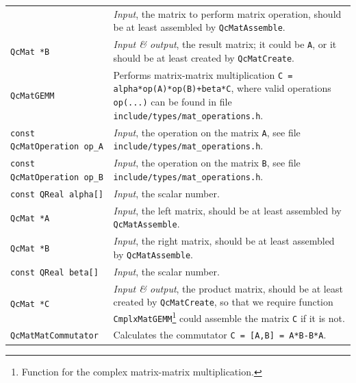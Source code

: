 \documentclass[a4paper,11pt,twoside,openright]{book}
\begin{document}
\begin{center}
\begin{longtable}{l|p{}}
      & \textsl{Input}, the matrix to perform matrix operation, should be
        at least assembled by \verb|QcMatAssemble|.\\
    \hspace*{2ex}\verb|QcMat *B| %
      & \textsl{Input \& output}, the result matrix; it could be \verb|A|, or it should
        be at least created by \verb|QcMatCreate|.\\
    \hline
%
    \verb|QcMatGEMM|\index{\texttt{QcMatGEMM}} %
      & Performs matrix-matrix multiplication \verb|C = alpha*op(A)*op(B)+beta*C|,
        where valid operations \verb|op(...)| can be found in file
        \verb|include/types/mat_operations.h|.\\
    \hspace*{2ex}\verb|const QcMatOperation op_A| %
      & \textsl{Input}, the operation on the matrix \verb|A|, see file
        \verb|include/types/mat_operations.h|.\\
    \hspace*{2ex}\verb|const QcMatOperation op_B| %
      & \textsl{Input}, the operation on the matrix \verb|B|, see file
        \verb|include/types/mat_operations.h|.\\
    \hspace*{2ex}\verb|const QReal alpha[]| %
      & \textsl{Input}, the scalar number.\\
    \hspace*{2ex}\verb|QcMat *A| %
      & \textsl{Input}, the left matrix, should be at least assembled
        by \verb|QcMatAssemble|.\\
    \hspace*{2ex}\verb|QcMat *B| %
      & \textsl{Input}, the right matrix, should be at least assembled
        by \verb|QcMatAssemble|.\\
    \hspace*{2ex}\verb|const QReal beta[]| %
      & \textsl{Input}, the scalar number.\\
    \hspace*{2ex}\verb|QcMat *C| %
      & \textsl{Input \& output}, the product matrix, should be at least created
        by \verb|QcMatCreate|, so that we require function
        \verb|CmplxMatGEMM|\footnote{Function for the complex matrix-matrix multiplication.}
        could assemble the matrix \verb|C| if it is not.\\
    \hline
%
    \verb|QcMatMatCommutator|\index{\texttt{QcMatMatCommutator}} %
      & Calculates the commutator \verb|C = [A,B] = A*B-B*A|.\\

\end{longtable}
\end{center}
\end{document}
